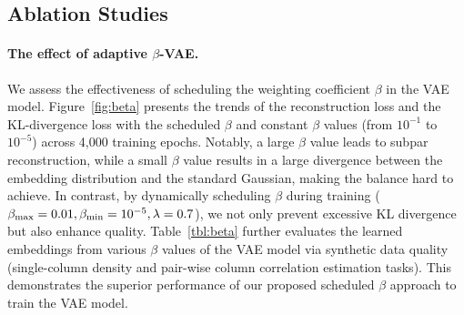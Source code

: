 \subsection{Ablation Studies}\label{sec:exp-ablation}
\paragraph{The effect of adaptive $\beta$-VAE.} We assess the effectiveness of scheduling the weighting coefficient $\beta$ in the VAE model. Figure~\ref{fig:beta} presents the trends of the reconstruction loss and the KL-divergence loss with the scheduled $\beta$ and constant $\beta$ values (from $10^{-1}$ to $10^{-5}$) across 4,000 training epochs. Notably, a large $\beta$  value leads to subpar reconstruction, while a small $\beta$ value results in a large divergence between the embedding distribution and the standard Gaussian, making the balance hard to achieve. In contrast, by dynamically scheduling $\beta$ during training  ($\beta_{\rm max} = 0.01, \beta_{\rm min} = 10^{-5}, \lambda = 0.7$), we not only prevent excessive KL divergence but also enhance quality. Table~\ref{tbl:beta} further evaluates the learned embeddings from various $\beta$ values of the VAE model via synthetic data quality (single-column density and pair-wise column correlation estimation tasks). This demonstrates the superior performance of our proposed scheduled $\beta$ approach to train the VAE model.
